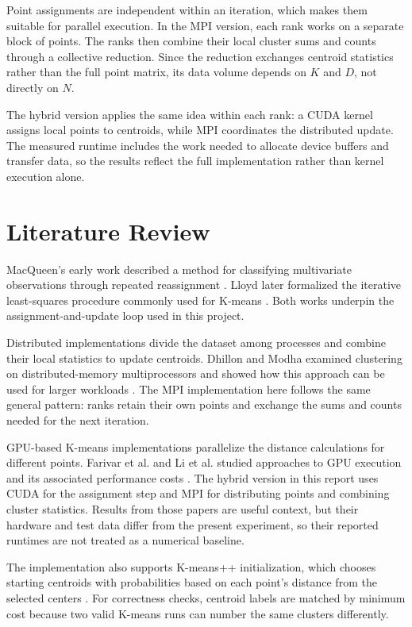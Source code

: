 \documentclass[conference]{IEEEtran}
\begin{document}
Point assignments are independent within an iteration, which makes them suitable for parallel execution. In the MPI version, each rank works on a separate block of points. The ranks then combine their local cluster sums and counts through a collective reduction. Since the reduction exchanges centroid statistics rather than the full point matrix, its data volume depends on $K$ and $D$, not directly on $N$.

The hybrid version applies the same idea within each rank: a CUDA kernel assigns local points to centroids, while MPI coordinates the distributed update. The measured runtime includes the work needed to allocate device buffers and transfer data, so the results reflect the full implementation rather than kernel execution alone.

\section{Literature Review}
\label{sec:literature}
MacQueen's early work described a method for classifying multivariate observations through repeated reassignment \cite{macqueen1967}. Lloyd later formalized the iterative least-squares procedure commonly used for K-means \cite{lloyd1982}. Both works underpin the assignment-and-update loop used in this project.

Distributed implementations divide the dataset among processes and combine their local statistics to update centroids. Dhillon and Modha examined clustering on distributed-memory multiprocessors and showed how this approach can be used for larger workloads \cite{dhillon2000}. The MPI implementation here follows the same general pattern: ranks retain their own points and exchange the sums and counts needed for the next iteration.

GPU-based K-means implementations parallelize the distance calculations for different points. Farivar et al. and Li et al. studied approaches to GPU execution and its associated performance costs \cite{farivar2008,li2013}. The hybrid version in this report uses CUDA for the assignment step and MPI for distributing points and combining cluster statistics. Results from those papers are useful context, but their hardware and test data differ from the present experiment, so their reported runtimes are not treated as a numerical baseline.

The implementation also supports K-means++ initialization, which chooses starting centroids with probabilities based on each point's distance from the selected centers \cite{arthur2007}. For correctness checks, centroid labels are matched by minimum cost because two valid K-means runs can number the same clusters differently.
\end{document}
